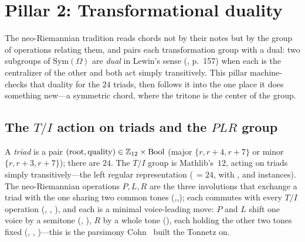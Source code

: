 
\section{Pillar 2: Transformational duality}\label{sec:pillar2}


The neo-Riemannian tradition reads chords not by their notes but by the group of operations
relating them, and pairs each transformation group with a dual: two subgroups of
$\mathrm{Sym}(\Omega)$ are \emph{dual} in Lewin's sense (\cite{Lewin}, p.~157) when each is the
centralizer of the other and both act simply transitively. This pillar machine-checks that duality
for the $24$ triads, then follows it into the one place it does something new---a symmetric chord,
where the tritone is the center of the group.

\subsection{The $T/I$ action on triads and the $PLR$ group}\label{sec:p2-ti}

A \emph{triad} is a pair $(\mathrm{root},\mathrm{quality})\in\mathbb{Z}_{12}\times\mathrm{Bool}$ (major
$\{r,r{+}4,r{+}7\}$ or minor $\{r,r{+}3,r{+}7\}$); there are $24$. The $T/I$ group is Mathlib's
\,$12$, acting on triads simply transitively---the left regular representation
(\,$=24$, with ,  and 
instances). The neo-Riemannian operations $P,L,R$ are the three involutions that exchange a triad
with the one sharing two common tones (,,); each commutes with every
$T/I$ operation (, , ), and each is a minimal
voice-leading move: $P$ and $L$ shift one voice by a semitone (,
), $R$ by a whole tone (), each holding the other
two tones fixed (, , )---this is the
parsimony Cohn~\cite{Cohn} built the Tonnetz on.

